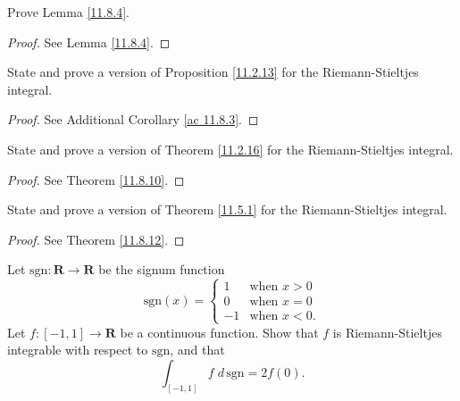 \exercisesection

\begin{exercise}\label{ex 11.8.1}
    Prove Lemma \ref{11.8.4}.
\end{exercise}

\begin{proof}
    See Lemma \ref{11.8.4}.
\end{proof}

\begin{exercise}\label{ex 11.8.2}
    State and prove a version of Proposition \ref{11.2.13} for the Riemann-Stieltjes integral.
\end{exercise}

\begin{proof}
    See Additional Corollary \ref{ac 11.8.3}.
\end{proof}

\begin{exercise}\label{ex 11.8.3}
    State and prove a version of Theorem \ref{11.2.16} for the Riemann-Stieltjes integral.
\end{exercise}

\begin{proof}
    See Theorem \ref{11.8.10}.
\end{proof}

\begin{exercise}\label{ex 11.8.4}
    State and prove a version of Theorem \ref{11.5.1} for the Riemann-Stieltjes integral.
\end{exercise}

\begin{proof}
    See Theorem \ref{11.8.12}.
\end{proof}

\begin{exercise}\label{ex 11.8.5}
    Let \(\text{sgn} : \mathbf{R} \to \mathbf{R}\) be the signum function
    \[
        \text{sgn}(x) = \begin{cases}
            1  & \text{when } x > 0  \\
            0  & \text{when } x = 0  \\
            -1 & \text{when } x < 0.
        \end{cases}
    \]
    Let \(f : [-1, 1] \to \mathbf{R}\) be a continuous function.
    Show that \(f\) is Riemann-Stieltjes integrable with respect to \(\text{sgn}\), and that
    \[
        \int_{[-1, 1]} f \; d \, \text{sgn} = 2f(0).
    \]
\end{exercise}

